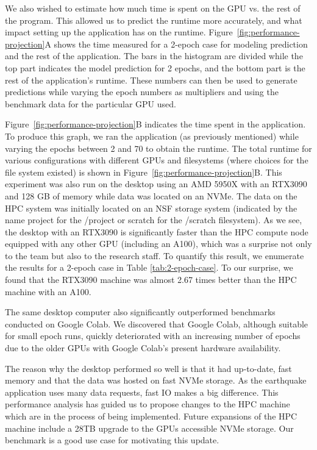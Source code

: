 \documentclass[utf8]{FrontiersinVancouver} %
\begin{document}
We also wished to estimate how much time is spent on the GPU vs. the rest of the program. This allowed us to predict the runtime more accurately, and what impact setting up the application has on the runtime.  Figure~\ref{fig:performance-projection}A shows the time measured for a 2-epoch case for modeling prediction and the rest of the application. The bars in the histogram are divided while the top part indicates the model prediction for 2 epochs, and the bottom part is the rest of the application's runtime. These numbers can then be used to generate predictions while varying the epoch numbers as multipliers and using the benchmark data for the particular GPU used.

Figure~\ref{fig:performance-projection}B indicates the time spent in the application. To produce this graph, we ran the application (as previously mentioned) while varying the epochs between 2 and 70 to obtain the runtime. The total runtime for various configurations with different GPUs and filesystems (where choices for the file system existed) is shown in Figure~\ref{fig:performance-projection}B. This experiment was also run on the desktop using an AMD 5950X with an RTX3090 and 128 GB of memory while data was located on an NVMe. The data on the HPC system was initially located on an NSF storage system (indicated by the name project for the /project or scratch for the /scratch filesystem). As we see, the desktop with an RTX3090 is significantly faster than the HPC compute node equipped with any other GPU (including an A100), which was a surprise not only to the team but also to the research staff. To quantify this result, we enumerate the results for a 2-epoch case in Table \ref{tab:2-epoch-case}. To our surprise, we found that the RTX3090 machine was almost 2.67 times better than the HPC machine with an A100.

The same desktop computer also significantly outperformed benchmarks conducted on Google Colab. We discovered that Google Colab, although suitable for small epoch runs, quickly deteriorated with an increasing number of epochs due to the older GPUs with Google Colab's present hardware availability.

The reason why the desktop performed so well is that it had up-to-date, fast memory and that the data was hosted on fast NVMe storage. As the earthquake application uses many data requests, fast IO makes a big difference. This performance analysis has guided us to propose changes to the HPC machine which are in the process of being implemented. Future expansions of the HPC machine include a 28TB upgrade to the GPUs accessible NVMe storage. Our benchmark is a good use case for motivating this update.
\end{document}

